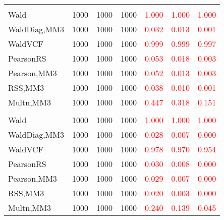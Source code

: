 \documentclass[
]{article}
\begin{document}
\begin{table}[H]
{\begin{tabular}[t]{lrrrrrr}
\addlinespace[0.3em]
\multicolumn{7}{l}{\textbf{2F 10V}}\\
\hspace{1em}Wald & 1000 & 1000 & 1000 & \textcolor{red}{1.000} & \textcolor{red}{1.000} & \vphantom{1} \textcolor{red}{1.000}\\
\hspace{1em}WaldDiag,MM3 & 1000 & 1000 & 1000 & \textcolor{red}{0.032} & \textcolor{red}{0.013} & \textcolor{red}{0.001}\\
\hspace{1em}WaldVCF & 1000 & 1000 & 1000 & \textcolor{red}{0.999} & \textcolor{red}{0.999} & \textcolor{red}{0.997}\\
\hspace{1em}PearsonRS & 1000 & 1000 & 1000 & \textcolor{red}{0.053} & \textcolor{red}{0.018} & \textcolor{red}{0.003}\\
\hspace{1em}Pearson,MM3 & 1000 & 1000 & 1000 & \textcolor{red}{0.052} & \textcolor{red}{0.013} & \textcolor{red}{0.003}\\
\hspace{1em}RSS,MM3 & 1000 & 1000 & 1000 & \textcolor{red}{0.038} & \textcolor{red}{0.010} & \textcolor{red}{0.001}\\
\hspace{1em}Multn,MM3 & 1000 & 1000 & 1000 & \textcolor{red}{0.447} & \textcolor{red}{0.318} & \textcolor{red}{0.151}\\
\addlinespace[0.3em]
\multicolumn{7}{l}{\textbf{3F 15V}}\\
\hspace{1em}Wald & 1000 & 1000 & 1000 & \textcolor{red}{1.000} & \textcolor{red}{1.000} & \textcolor{red}{1.000}\\
\hspace{1em}WaldDiag,MM3 & 1000 & 1000 & 1000 & \textcolor{red}{0.028} & \textcolor{red}{0.007} & \textcolor{red}{0.000}\\
\hspace{1em}WaldVCF & 1000 & 1000 & 1000 & \textcolor{red}{0.978} & \textcolor{red}{0.970} & \textcolor{red}{0.954}\\
\hspace{1em}PearsonRS & 1000 & 1000 & 1000 & \textcolor{red}{0.030} & \textcolor{red}{0.008} & \textcolor{red}{0.000}\\
\hspace{1em}Pearson,MM3 & 1000 & 1000 & 1000 & \textcolor{red}{0.029} & \textcolor{red}{0.007} & \textcolor{red}{0.000}\\
\hspace{1em}RSS,MM3 & 1000 & 1000 & 1000 & \textcolor{red}{0.020} & \textcolor{red}{0.003} & \textcolor{red}{0.000}\\
\hspace{1em}Multn,MM3 & 1000 & 1000 & 1000 & \textcolor{red}{0.240} & \textcolor{red}{0.139} & \textcolor{red}{0.045}\\
\bottomrule
\end{tabular}}
\endgroup{}
\end{table}
\end{document}
